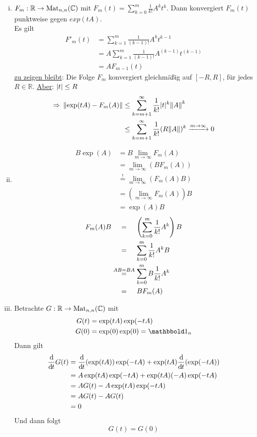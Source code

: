  \begin{enumerate}[(i)]
	\item $F_m: \mathbb{R} \to \operatorname{Mat}_{n,n}(\mathbb{C})$ mit $F_m(t)= \sum_{k=0}^{m}\frac{1}{k!}A^kt^k$. Dann konvergiert $F_m(t)$ punktweise gegen $exp(tA)$. \\
	Es gilt
	\begin{align*}
		F'_m(t)&= \sum_{k=1}^{m}\frac{1}{(k-1)!}A^kt^{k-1} \\ &= A \sum_{k=1}^{m}\frac{1}{(k-1)!}A^{(k-1)}t^{(k-1)} \\ &= A F_{m-1}(t)
	\end{align*}
	\underline{zu zeigen bleibt}: Die Folge $F_m$ konvergiert gleichmäßig auf $[-R,R]$, für jedes $R \in \mathbb{R}$.
	\underline{Aber}: $\lvert t\rvert\leq R$
	\begin{align*}
		\Rightarrow \,	 \norm{ \exp(tA)-F_m(A)} &\leq \sum_{k=m+1}^{\infty}\frac{1}{k!} \abs{t}^k \norm{A}^k \\ &\leq \sum_{k=m+1}^{\infty}\frac{1}{k!}(R \norm{A})^k \xrightarrow{m \to \infty}0  
	\end{align*}
	\item \begin{align*}
		B \exp(A) &= B \lim_{m \to \infty}F_m(A) \\
		&= \lim_{m \to \infty} (BF_m(A)) \\
		& \stackrel{!}{=} \lim_{m \to \infty}(F_m(A)B) \\
		&= (\lim_{m \to \infty}F_m(A))B \\
		&=\exp(A)B
	\end{align*}
	\begin{align*}
		F_m(A)B & \stackrel{\hphantom{AB=BA}}{=} \left( \sum_{k=0}^{m}\frac{1}{k!}A^k \right)B \\
		& \stackrel{\hphantom{AB=BA}}{=} \sum_{k=0}^{m}\frac{1}{k!}A^kB \\ &\stackrel{AB=BA}{=} \sum_{k=0}^{m}B \frac{1}{k!}A^k \\
		 &\stackrel{\hphantom{AB=BA}}{=} B F_m(A)
	\end{align*}
	\item Betrachte $G: \mathbb{R} \to \operatorname{Mat}_{n,n}(\mathbb{C})$ mit
	\begin{align*}
		G(t)&=\exp(tA)\exp(-tA) \\
		G(0)&=\exp(0) \exp(0)= \ind_n
	\end{align*}
	Dann gilt
	\begin{align*}
		\frac{\mathrm{d}\mkern-1.0mu }{\mathrm{d}\mkern-1.0mu t} G(t) &= \frac{\mathrm{d}\mkern-1.0mu }{\mathrm{d}\mkern-1.0mu t} (\exp(tA))\exp(-tA)+ \exp(tA)\frac{\mathrm{d}\mkern-1.0mu }{\mathrm{d}\mkern-1.0mu t} (\exp(-tA)) \\
		&= A\exp(tA)\exp(-tA)+ \exp(tA)(-A)\exp(-tA) \\
		&= AG(t)-A\exp(tA)\exp(-tA) \\
		&= AG(t)-AG(t) \\
		&= 0
	\end{align*}
	Und dann folgt
	\[
		G(t)=G(0)
	\]
\end{enumerate}
\cleardoubleoddemptypage
{}
\setcounter{page}{1}
\printindex

	
